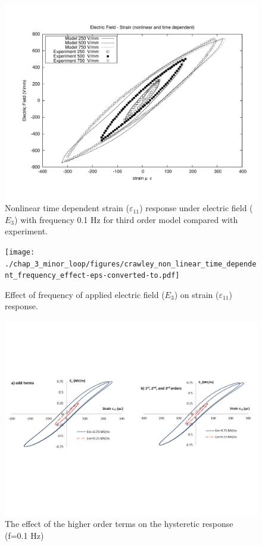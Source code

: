\begin{figure}
\centering
\includegraphics[width=5.0in]
{./chap_3_minor_loop/figures/crawley_non_linear_time_independent_third_order.pdf}
\caption{Nonlinear time dependent strain ($\varepsilon_{11}$) response under electric field ($E_3$) with frequency 0.1 Hz for third order model compared with experiment\cite{Crawley1990}.}
\label{fig:TimeDepenNonLinCrawleyThirdordermodel}
\end{figure}


\begin{figure}
\centering
\texttt{[image: ./chap\_3\_minor\_loop/figures/crawley\_non\_linear\_time\_dependent\_frequency\_effect-eps-converted-to.pdf]}
\caption{Effect of frequency of applied electric field ($E_3$) on strain ($\varepsilon_{11}$) response.}
\label{fig:Frequency_Effect}
\end{figure}

\begin{figure}
\centering
\includegraphics[width=5.0in]
{./chap_3_minor_loop/figures/figure_3_8_the_effect_of_the_higher_order_terms_on_the_hysteretic_response.pdf}
\caption{The effect of the higher order terms on the hysteretic response (f=0.1 Hz)}
\label{figure_3_8_the_effect_of_the_higher_order_terms_on_the_hysteretic_response}
\end{figure}


